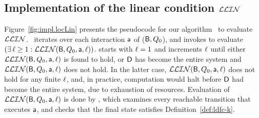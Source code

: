 






   \subsection{Implementation of the linear condition $\mathcal{LLIN}$}
   \label{s:implLin}
%   
  



Figure~\ref{fig:impl.locLin} presents the pseudocode for our algorithm
\ to evaluate $\mathcal{LLIN}$.
%
\ iterates over each interaction $\mathsf{a}$ of ($\mathsf{B},Q_0$), and 
invokes  to evaluate $(\exists\, \ell \ge 1: \mathcal{LLIN}(\mathsf{B}, Q_0, \mathsf{a}, \ell))$.
starts with $\ell=1$ and increments $\ell$ until either $\mathcal{LLIN}(\mathsf{B}, Q_0, \mathsf{a}, \ell)$ is found to hold, or
$\mathsf{D}$ has become the entire system and $\mathcal{LLIN}(\mathsf{B}, Q_0, \mathsf{a}, \ell)$ does not hold. In the
latter case, $\mathcal{LLIN}(\mathsf{B}, Q_0, \mathsf{a}, \ell)$ does not hold for any finite $\ell$, and, in practice,
computation would halt before $\mathsf{D}$ had become the entire system, due to exhaustion of
resources. Evaluation of $\mathcal{LLIN}(\mathsf{B}, Q_0, \mathsf{a}, \ell)$ is done by 
, which examines every reachable transition
that executes $\mathsf{a}$, and checks that the final state satisfies
Definition~\ref{def:ldfc-k}. 

